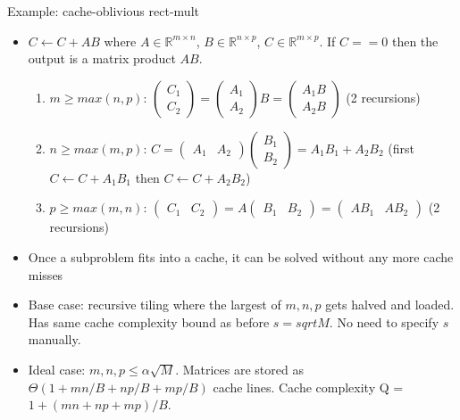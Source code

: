 Example: cache-oblivious rect-mult
\begin{itemize}
    \item $C \leftarrow C + AB$ where $A \in \mathbb{R}^{m\times n}$, $B \in \mathbb{R}^{n\times p}$, $C \in \mathbb{R}^{m\times p}$. If $C == 0$ then the output is a matrix product $AB$.
    \begin{enumerate}
        \item $m \geq max(n, p)$: $\begin{pmatrix} C_1 \\ C_2 \end{pmatrix} = \begin{pmatrix} A_1 \\ A_2 \end{pmatrix} B = \begin{pmatrix} A_1B \\ A_2B \end{pmatrix}$ (2 recursions)
        \item $n \geq max(m, p)$: $C = \begin{pmatrix} A_1 & A_2 \end{pmatrix} \begin{pmatrix} B_1 \\ B_2 \end{pmatrix} = A_1B_1 + A_2B_2$ (first $C \leftarrow C + A_1B_1$ then $C \leftarrow C + A_2B_2$) 
        \item $p \geq max(m, n)$: $\begin{pmatrix} C_1 & C_2 \end{pmatrix} = A \begin{pmatrix} B_1 & B_2 \end{pmatrix} = \begin{pmatrix} AB_1 & AB_2 \end{pmatrix}$ (2 recursions)
    \end{enumerate}
    \item Once a subproblem fits into a cache, it can be solved without any more cache misses
    \item Base case: recursive tiling where the largest of $m, n, p$ gets halved and loaded. Has same cache complexity bound as before $s = sqrt{M}$. No need to specify $s$ manually.
    \item Ideal case: $m, n, p \leq \alpha\sqrt{M}$. Matrices are stored as $\Theta(1 + mn/B + np/B + mp/B)$ cache lines. Cache complexity Q = $1 + (mn + np + mp)/B$.
\end{itemize}

\newpage
